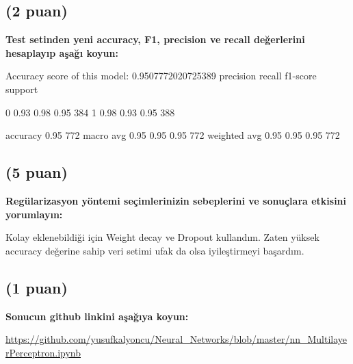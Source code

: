 \documentclass[11pt]{article}
\begin{document}
\subsection{(2 puan)} \textbf{Test setinden yeni accuracy, F1, precision ve recall değerlerini hesaplayıp aşağı koyun:}

\begin{python}
    Accuracy score of this model: 0.9507772020725389
              precision    recall  f1-score   support

           0       0.93      0.98      0.95       384
           1       0.98      0.93      0.95       388

    accuracy                           0.95       772
   macro avg       0.95      0.95      0.95       772
weighted avg       0.95      0.95      0.95       772
\end{python}

\subsection{(5 puan)} \textbf{Regülarizasyon yöntemi seçimlerinizin sebeplerini ve sonuçlara etkisini yorumlayın:}

Kolay eklenebildiği için Weight decay ve Dropout kullandım. Zaten yüksek accuracy değerine sahip veri setimi ufak da olsa iyileştirmeyi başardım.

\subsection{(1 puan)} \textbf{Sonucun github linkini  aşağıya koyun:}

\url{https://github.com/yusufkalyoncu/Neural_Networks/blob/master/nn_MultilayerPerceptron.ipynb}
\end{document}
